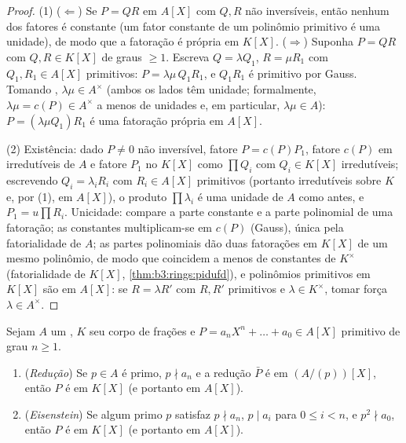 \begin{proof}
(1) ($\Leftarrow$) Se $P = QR$ em $A[X]$ com $Q, R$ não
inversíveis, então nenhum dos fatores é constante (um fator constante
de um polinômio primitivo é uma unidade), de modo que a fatoração é
própria em $K[X]$. ($\Rightarrow$) Suponha $P = QR$ com $Q, R \in K[X]$ de graus
$\geq 1$. Escreva $Q = \lambda Q_1$, $R = \mu R_1$ com $Q_1, R_1
\in A[X]$ primitivos: $P = \lambda\mu\, Q_1R_1$, e
$Q_1R_1$ é primitivo por Gauss. Tomando , $\lambda\mu \in A^\times$ (ambos os
lados têm  unidade; formalmente, $\lambda\mu = c(P) \in
A^\times$ a menos de unidades e,
em particular, $\lambda \mu \in A$): $P
= (\lambda\mu Q_1) R_1$ é uma fatoração própria em $A[X]$.

(2) Existência: dado $P \neq 0$ não inversível, fatore $P = c(P)P_1$, fatore
$c(P)$ em irredutíveis de $A$ e fatore $P_1$ no 
$K[X]$ como $\prod Q_i$ com $Q_i \in K[X]$ irredutíveis; escrevendo $Q_i = \lambda_i R_i$ com
$R_i \in A[X]$ primitivos (portanto irredutíveis sobre $K$ e, por (1), em
$A[X]$), o produto $\prod \lambda_i$ é uma unidade de $A$ como antes, e
$P_1 = u\prod
R_i$. Unicidade: compare a parte constante e a parte polinomial de uma
fatoração; as constantes multiplicam-se em $c(P)$ (Gauss), única
pela fatorialidade de $A$; as partes polinomiais dão duas
fatorações em $K[X]$ de um mesmo polinômio, de modo que coincidem a
menos de constantes de $K^\times$ (fatorialidade de $K[X]$,
\cref{thm:b3:rings:pidufd}), e polinômios primitivos  em $K[X]$ são
 em $A[X]$: se $R = \lambda R'$ com $R, R'$ primitivos e $\lambda \in K^\times$,
tomar  força $\lambda \in A^\times$.
\end{proof}

\begin{theorem}\label{thm:b3:rings:criteria}
Sejam $A$ um , $K$ seu corpo de frações e $P = a_nX^n + \dots
+ a_0 \in A[X]$ primitivo de
grau $n \geq 1$.
\begin{enumerate}
  \item (\emph{Redução}) Se $p \in A$ é primo, $p \nmid a_n$ e a redução
        $\bar P$ é  em $(A/(p))[X]$, então $P$ é
         em $K[X]$ (e portanto em $A[X]$).
  \item (\emph{Eisenstein}) Se algum
        primo $p$ satisfaz $p \nmid a_n$, $p \mid a_i$ para $0
        \leq i < n$, e $p^2 \nmid a_0$, então
        $P$ é  em $K[X]$ (e portanto em $A[X]$).
\end{enumerate}
\end{theorem}

